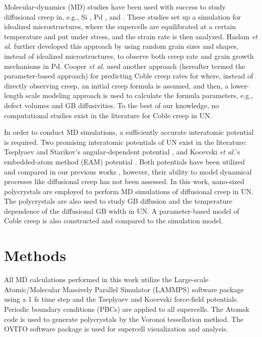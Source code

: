 \documentclass[preprint, 12pt]{elsarticle}
\newcommand{\?}{\stackrel{?}{=}}
\begin{document}

Molecular-dynamics (MD) studies have been used with success to study diffusional creep in, e.g., Si \cite{Keblinski1998}, Pd \cite{Yamakov2002}, and  \cite{Desai2008, Galvin2024b}. These studies set up a simulation for idealized microstructures, where the supercells are equilibrated at a certain temperature and put under stress, and the strain rate is then analyzed. Haslam \textit{et al.} \cite{Haslam2004} further developed this approach by using random grain sizes and shapes, instead of idealized microstructures, to observe both creep rate and grain growth mechanisms in Pd. Cooper \textit{et al.} \cite{Cooper2021} used another approach (hereafter termed the parameter-based approach) for predicting Coble creep rates for  where, instead of directly observing creep, an initial creep formula is assumed, and then, a lower-length scale modeling approach is used to calculate the formula parameters, e.g., defect volumes and GB diffusivities. To the best of our knowledge, no computational studies exist in the literature for Coble creep in UN.

In order to conduct MD simulations, a sufficiently accurate interatomic potential is required. Two promising interatomic potentials of UN exist in the literature: Tseplyaev and Starikov's angular-dependent potential \cite{Tseplyaev2016}, and Kocevski \textit{et al.}'s embedded-atom method (EAM) potential \cite{Kocevski2022II}. Both potentials have been utilized and compared in our previous works \cite{AbdulHameed2024, AbdulHameed2024b}, however, their ability to model dynamical processes like diffusional creep has not been assessed. In this work, nano-sized polycrystals are employed to perform MD simulations of diffusional creep in UN. The polycrystals are also used to study GB diffusion and the temperature dependence of the diffusional GB width in UN. A parameter-based model of Coble creep is also constructed and compared to the simulation model. %

\section{Methods}

All MD calculations performed in this work utilize the Large-scale Atomic/Molecular Massively Parallel Simulator (LAMMPS) software package \cite{Thompson2022} using a 1 fs time step and the Tseplyaev \cite{Tseplyaev2016} and Kocevski \cite{Kocevski2022II} force-field potentials. Periodic boundary conditions (PBCs) are applied to all supercells. The Atomsk code \cite{Hirel2015} is used to generate polycrystals by the Voronoi tessellation method. The OVITO software package \cite{Stukowski2010} is used for supercell visualization and analysis. 
\end{document}

